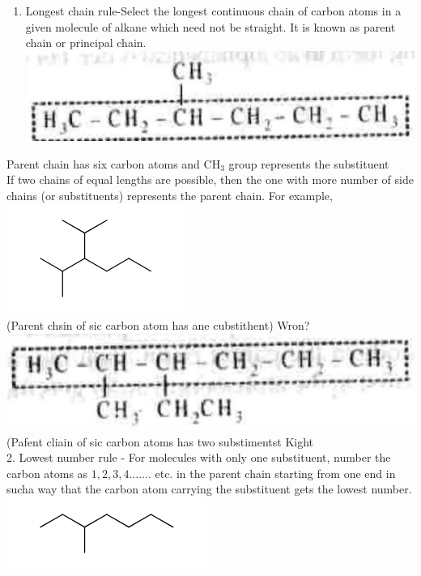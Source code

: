 \documentclass[10pt]{article}
\begin{document}
\begin{enumerate}
  \item Longest chain rule-Select the longest continuous chain of carbon atoms in a given molecule of alkane which need not be straight. It is known as parent chain or principal chain.\\
\includegraphics[max width=\textwidth, center]{2025_01_28_8470952b98110cec3aabg-019(1)}
\end{enumerate}

Parent chain has six carbon atoms and $\mathrm{CH}_{3}$ group represents the substituent\\
If two chains of equal lengths are possible, then the one with more number of side chains (or substituents) represents the parent chain. For example,\\
\includegraphics{smile-4d19bb2ab14985fbb098e3fea672371ea719e01d}\\
(Parent chsin of sic carbon atom has ane cubstithent) Wron?\\
\includegraphics[max width=\textwidth, center]{2025_01_28_8470952b98110cec3aabg-019}\\
(Pafent cliain of sic carbon atoms has two substimentst Kight\\
2. Lowest number rule - For molecules with only one substituent, number the carbon atoms as $1,2,3,4 \ldots \ldots$. etc. in the parent chain starting from one end in sucha way that the carbon atom carrying the substituent gets the lowest number.\\
\includegraphics{smile-21da64147963a1ef64e5cc22eb8aa1ad496bc50f}
\end{document}
